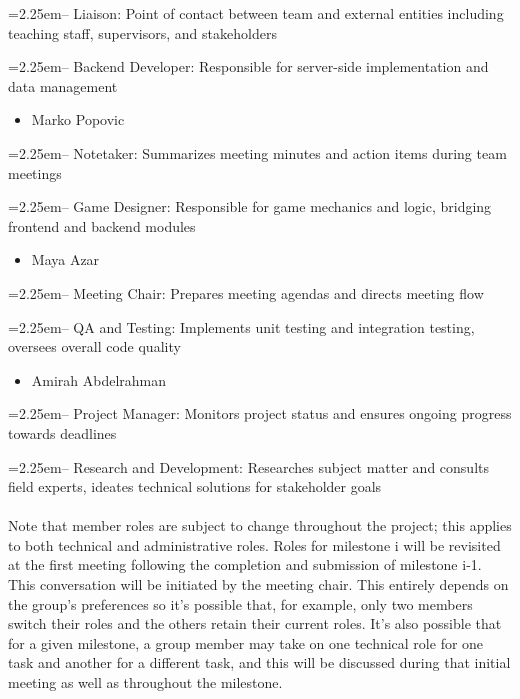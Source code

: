 \documentclass{article}
\begin{document}
\hangindent=2.25em-- Liaison: Point of contact between team and external entities including teaching staff, supervisors, and stakeholders

\hangindent=2.25em-- Backend Developer: Responsible for server-side implementation and data management

\begin{itemize}
  \item Marko Popovic
\end{itemize}

\hangindent=2.25em-- Notetaker: Summarizes meeting minutes and action items during team meetings

\hangindent=2.25em-- Game Designer: Responsible for game mechanics and logic, bridging frontend and backend modules

\begin{itemize}
  \item Maya Azar
\end{itemize}

\hangindent=2.25em-- Meeting Chair: Prepares meeting agendas and directs meeting flow

\hangindent=2.25em-- QA and Testing: Implements unit testing and integration testing, oversees overall code quality

\begin{itemize}
  \item Amirah Abdelrahman
\end{itemize}

\hangindent=2.25em-- Project Manager: Monitors project status and ensures ongoing progress towards deadlines

\hangindent=2.25em-- Research and Development: Researches subject matter and consults field experts, ideates technical solutions for stakeholder goals
\\
\\
Note that member roles are subject to change throughout the project; this applies to both technical
and administrative roles. Roles for milestone i will be revisited at the first meeting following the completion
and submission of milestone i-1. This conversation will be initiated by the meeting chair. This entirely depends on the group's
preferences so it's possible that, for example,
only two members switch their roles and the others retain their current roles. It's also possible that for a given
milestone, a group member may take on one technical role for one task and another for a different task, and this will be discussed
during that initial meeting as well as throughout the milestone.
\end{document}
